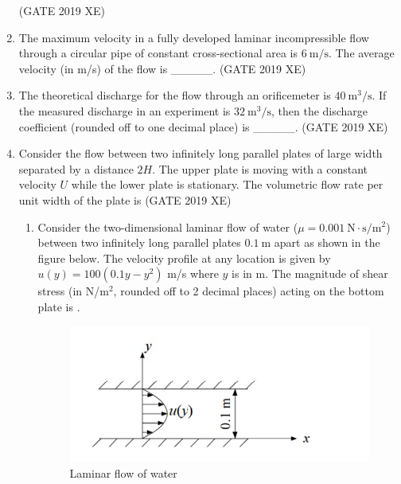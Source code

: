\documentclass[journal,12pt,onecolumn]{IEEEtran}
\begin{document}
\begin{enumerate}
\hfill{(GATE 2019 XE)} \\


\item The maximum velocity in a fully developed laminar incompressible flow through a circular pipe of constant cross-sectional area is $6\ \mathrm{m/s}$. The average velocity (in m/s) of the flow is \_\_\_\_\_.
\hfill{(GATE 2019 XE)} \\


\item The theoretical discharge for the flow through an orificemeter is $40\ \mathrm{m^3/s}$. If the measured discharge in an experiment is $32\ \mathrm{m^3/s}$, then the discharge coefficient (rounded off to one decimal place) is \_\_\_\_\_.
\hfill{(GATE 2019 XE)} \\


\item Consider the flow between two infinitely long parallel plates of large width separated by a distance $2H$. The upper plate is moving with a constant velocity $U$ while the lower plate is stationary. The volumetric flow rate per unit width of the plate is
\hfill{(GATE 2019 XE)} \\
\begin{multicols}{2}
\begin{enumerate}
=======

\vspace{0.5cm}

\item Consider the two-dimensional laminar flow of water ($\mu=0.001\ \mathrm{N\cdot s/m^2}$) between two infinitely long parallel plates $0.1\ \mathrm{m}$ apart as shown in the figure below. The velocity profile at any location is given by $u(y)=100(0.1y-y^2)$ m/s where $y$ is in m. The magnitude of shear stress (in N/m$^2$, rounded off to 2 decimal places) acting on the bottom plate is \underline{\hspace{2cm}}.

\begin{figure}[htbp]
  \centering
  \includegraphics[width=.7\linewidth]{figs/B/fig1.png}
  \caption{Laminar flow of water}
  \label{B/fig1}
\end{figure}


\end{enumerate}
\end{multicols}
\end{enumerate}
\end{document}
